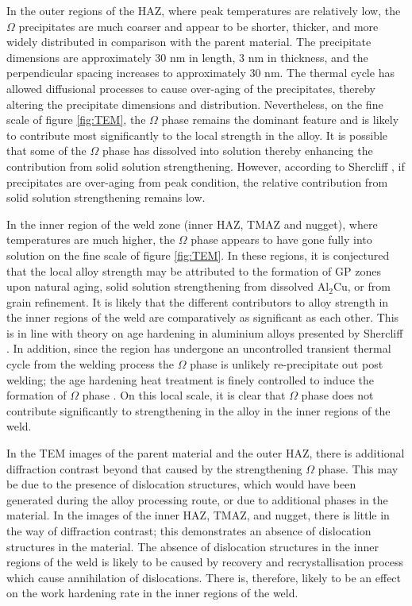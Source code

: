 	In the outer regions of the HAZ, where peak temperatures are relatively low, the $\Omega$ precipitates are much coarser and appear to be shorter, thicker, and more widely distributed in comparison with the parent material. The precipitate dimensions are approximately 30 nm in length, 3 nm in thickness, and the perpendicular spacing increases to approximately 30 nm. The thermal cycle has allowed diffusional processes to cause over-aging of the precipitates, thereby altering the precipitate dimensions and distribution. Nevertheless, on the fine scale of figure \ref{fig:TEM}, the $\Omega$ phase remains the dominant feature and is likely to contribute most significantly to the local strength in the alloy. It is possible that some of the $\Omega$ phase has dissolved into solution thereby enhancing the contribution from solid solution strengthening. However, according to Shercliff \cite{Shercliff1990a}, if precipitates are over-aging from peak condition, the relative contribution from solid solution strengthening remains low.
	
	In the inner region of the weld zone (inner HAZ, TMAZ and nugget), where temperatures are much higher, the $\Omega$ phase appears to have gone fully into solution on the fine scale of figure \ref{fig:TEM}. In these regions, it is conjectured that the local alloy strength may be attributed to the formation of GP zones upon natural aging, solid solution strengthening from dissolved $\text{Al}_2$Cu, or from grain refinement. It is likely that the different contributors to alloy strength in the inner regions of the weld are comparatively as significant as each other. This is in line with theory on age hardening in aluminium alloys presented by Shercliff \cite{Shercliff1990a}. In addition, since the region has undergone an uncontrolled transient thermal cycle from the welding process the $\Omega$ phase is unlikely re-precipitate out post welding; the age hardening heat treatment is finely controlled to induce the formation of $\Omega$ phase \cite{Bakavos2008}. On this local scale, it is clear that $\Omega$ phase does not contribute significantly to strengthening in the alloy in the inner regions of the weld. 
	
	In the TEM images of the parent material and the outer HAZ, there is additional diffraction contrast beyond that caused by the strengthening $\Omega$ phase. This may be due to the presence of dislocation structures, which would have been generated during the alloy processing route, or due to additional phases in the material. In the images of the inner HAZ, TMAZ, and nugget, there is little in the way of diffraction contrast; this demonstrates an absence of dislocation structures in the material. The absence of dislocation structures in the inner regions of the weld is likely to be caused by recovery and recrystallisation process which cause annihilation of dislocations. There is, therefore, likely to be an effect on the work hardening rate in the inner regions of the weld.
	
